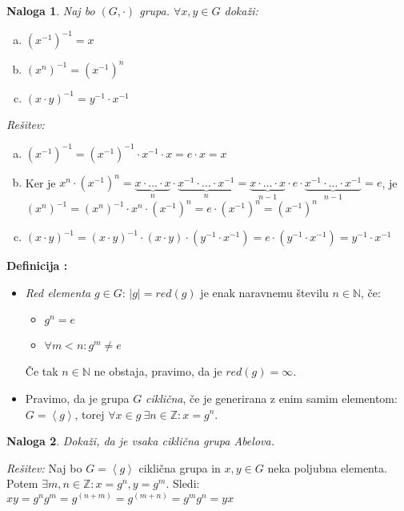 \documentclass[a4paper, 10pt]{article}
\newtheorem{nal}{Naloga}
\newcounter{defcount}
\newenvironment{definicija}{\begin{flushleft}\stepcounter{defcount}\textbf{Definicija \arabic{defcount}:}}{\hfill\end{flushleft}}
\newenvironment{resitev}{\begin{flushleft}\textit{Rešitev:}}{\hfill\end{flushleft}}
\newcommand{\abs}[1]{\ensuremath{\lvert #1 \rvert}}
\newcommand{\mth}[1]{\ensuremath{\mathbb{#1}}}
\newcommand{\Z}{\mth{Z}}
\newcommand{\N}{\mth{N}}
\newcommand{\pojem}[1]{\emph{#1}}
\begin{document}
	\begin{nal}
		Naj bo $(G, \cdot)$ grupa. $\forall x, y\in G$ dokaži: \begin{enumerate}[a)]
			\item $(x^{-1})^{-1} = x$
			\item $(x^n)^{-1} = (x^{-1})^n$
			\item $(x\cdot y)^{-1} = y^{-1}\cdot x^{-1}$
		\end{enumerate}
	\end{nal}
	\begin{resitev}
		\begin{enumerate}[a)]
			\item $(x^{-1})^{-1} = (x^{-1})^{-1} \cdot x^{-1}\cdot x = e\cdot x = x$
			\item Ker je $x^n \cdot (x^{-1})^n = \underbrace{x\cdot \ldots \cdot x}_{n}\cdot \underbrace{x^{-1} \cdot \ldots \cdot x^{-1}}_{n} = \underbrace{x\cdot \ldots \cdot x}_{n-1}\cdot e \cdot \underbrace{x^{-1} \cdot \ldots \cdot x^{-1}}_{n-1} = e$, je $(x^n)^{-1} = (x^n)^{-1} \cdot x^n \cdot (x^{-1})^n = e\cdot (x^{-1})^n = (x^{-1})^n$
			\item $(x\cdot y)^{-1} = (x\cdot y)^{-1} \cdot (x\cdot y) \cdot (y^{-1}\cdot x^{-1}) = e \cdot (y^{-1}\cdot x^{-1}) = y^{-1}\cdot x^{-1}$
		\end{enumerate}
	\end{resitev}
	\begin{definicija}
		\begin{itemize}
			\item \pojem{Red elementa} $g\in G$: $\abs{g} = red(g)$ je enak naravnemu številu $n\in \N$, če: \begin{itemize}
				\item $g^n = e$
				\item $\forall m< n: g^m \neq e$
			\end{itemize}
			Če tak $n\in\N$ ne obstaja, pravimo, da je $red(g) = \infty$.
			\item Pravimo, da je grupa $G$ \pojem{ciklična}, če je generirana z enim samim elementom: $G = \left<g\right>$, torej $\forall x \in g~\exists n\in \Z: x = g^n$.
		\end{itemize}
	\end{definicija}
	\begin{nal}
		Dokaži, da je vsaka ciklična grupa Abelova.
	\end{nal}
	\begin{resitev}
		Naj bo $G = \left<g\right>$ ciklična grupa in $x, y\in G$ neka poljubna elementa. Potem $\exists m, n\in \Z: x = g^n, y = g^m$. Sledi: $xy = g^ng^m = g^{(n + m)} = g^{(m + n)} = g^mg^n = yx$
	\end{resitev}
\end{document}
